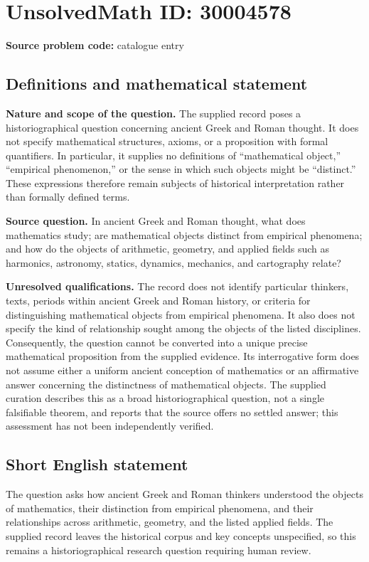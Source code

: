\documentclass[11pt]{article}
\begin{document}
\section*{UnsolvedMath ID: 30004578}
\textbf{Source problem code:} catalogue entry
\subsection{Definitions and mathematical statement}
\textbf{Nature and scope of the question.} The supplied record poses a historiographical question concerning ancient Greek and Roman thought. It does not specify mathematical structures, axioms, or a proposition with formal quantifiers. In particular, it supplies no definitions of ``mathematical object,'' ``empirical phenomenon,'' or the sense in which such objects might be ``distinct.'' These expressions therefore remain subjects of historical interpretation rather than formally defined terms.

\textbf{Source question.} In ancient Greek and Roman thought, what does mathematics study; are mathematical objects distinct from empirical phenomena; and how do the objects of arithmetic, geometry, and applied fields such as harmonics, astronomy, statics, dynamics, mechanics, and cartography relate?

\textbf{Unresolved qualifications.} The record does not identify particular thinkers, texts, periods within ancient Greek and Roman history, or criteria for distinguishing mathematical objects from empirical phenomena. It also does not specify the kind of relationship sought among the objects of the listed disciplines. Consequently, the question cannot be converted into a unique precise mathematical proposition from the supplied evidence. Its interrogative form does not assume either a uniform ancient conception of mathematics or an affirmative answer concerning the distinctness of mathematical objects. The supplied curation describes this as a broad historiographical question, not a single falsifiable theorem, and reports that the source offers no settled answer; this assessment has not been independently verified.
\subsection{Short English statement}
The question asks how ancient Greek and Roman thinkers understood the objects of mathematics, their distinction from empirical phenomena, and their relationships across arithmetic, geometry, and the listed applied fields. The supplied record leaves the historical corpus and key concepts unspecified, so this remains a historiographical research question requiring human review.
\end{document}
